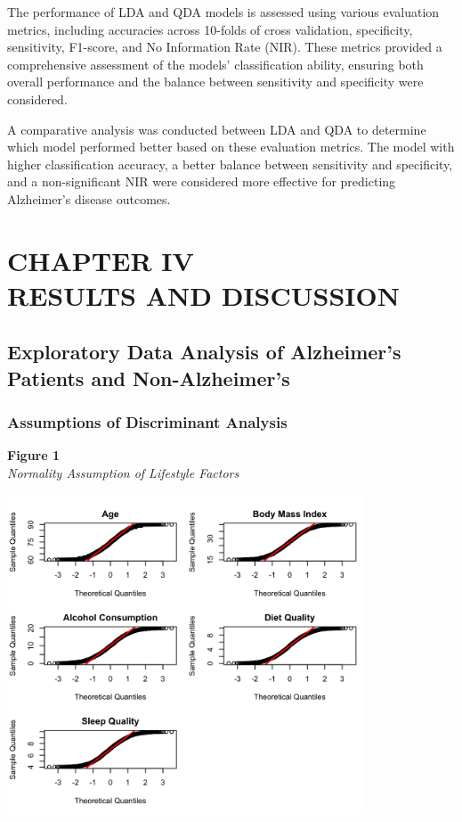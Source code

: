 \documentclass[12pt]{article}
\begin{document}
The performance of LDA and QDA models is assessed using various evaluation metrics, including accuracies across 10-folds of cross validation, specificity, sensitivity, F1-score, and No Information Rate (NIR). These metrics provided a comprehensive assessment of the models' 
classification ability, ensuring both overall performance and the balance between sensitivity and specificity were considered.

A comparative analysis was conducted between LDA and QDA to determine which model performed better based on these evaluation metrics. The model with higher classification accuracy, a better balance between sensitivity and specificity, and a non-significant NIR were considered 
more effective for predicting Alzheimer’s disease outcomes.

\newpage
\section{CHAPTER IV \\ RESULTS AND DISCUSSION}
\noindent

\subsection{Exploratory Data Analysis of Alzheimer's Patients and Non-Alzheimer's}
\subsubsection{Assumptions of Discriminant Analysis}
\textbf{Figure 1}\\
\textit{Normality Assumption of Lifestyle Factors}
\begin{center}
    \includegraphics[width = 0.8\textwidth]{QQ_Lifestyle.png}
\end{center}
\end{document}
